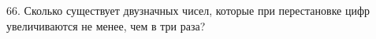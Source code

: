 66. Сколько существует двузначных чисел, которые при перестановке цифр увеличиваются не менее, чем в три раза?\\
